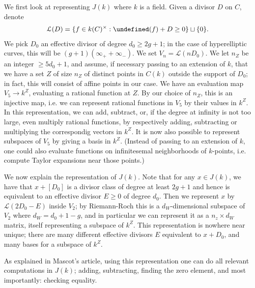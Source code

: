 \documentclass{article}
\newcommand{\Lcal}{\mathcal{L}}
\let\div\undefined
\DeclareMathOperator{\div}{div}
\theoremstyle{plain}
\theoremstyle{definition}
\theoremstyle{remark}
\begin{document}
We first look at representing $J(k)$ where $k$ is a field. Given a divisor $D$ on $C$, denote
\[
\Lcal(D) = \{f \in k(C)^\times : \div(f) + D \geq 0 \} \sqcup \{0\}.
\]
We pick $D_0$ an effective divisor of degree $d_0 \geq 2g+1$; in the case of hyperelliptic curves, this will be $(g+1)(\infty_+ + \infty_-)$. We set $V_n = \Lcal(nD_0)$. We let $n_Z$ be an integer $\geq 5d_0 + 1$, and assume, if necessary passing to an extension of $k$, that we have a set $Z$ of size $n_Z$ of distinct points in $C(k)$ outside the support of $D_0$; in fact, this will consist of affine points in our case. We have an evaluation map $V_5 \to k^Z$, evaluating a rational function at $Z$. By our choice of $n_Z$, this is an injective map, i.e. we can represent rational functions in $V_5$ by their values in $k^Z$. In this representation, we can add, subtract, or, if the degree at infinity is not too large, even multiply rational functions, by respectively adding, subtracting or multiplying the correspondig vectors in $k^Z$. It is now also possible to represent subspaces of $V_5$ by giving a basis in $k^Z$. (Instead of passing to an extension of $k$, one could also evaluate functions on infinitesemal neighborhoods of $k$-points, i.e. compute Taylor expansions near those points.)

We now explain the representation of $J(k)$. Note that for any $x \in J(k)$, we have that $x + [D_0]$ is a divisor class of degree at least $2g+1$ and hence is equivalent to an effective divisor $E \geq 0$ of degree $d_0$. Then we represent $x$ by $\Lcal(2D_0 - E)$ inside $V_2$; by Riemann-Roch this is a $d_W$-dimensional subspace of $V_2$ where $d_W = d_0 + 1 - g$, and in particular we can represent it as a $n_z \times d_W$ matrix, itself representing a subspace of $k^Z$. This representation is nowhere near unique; there are many different effective divisors $E$ equivalent to $x + D_0$, and many bases for a subspace of $k^Z$.

As explained in Mascot's article, using this representation one can do all relevant computations in $J(k)$; adding, subtracting, finding the zero element, and most importantly: checking equality.
\end{document}
